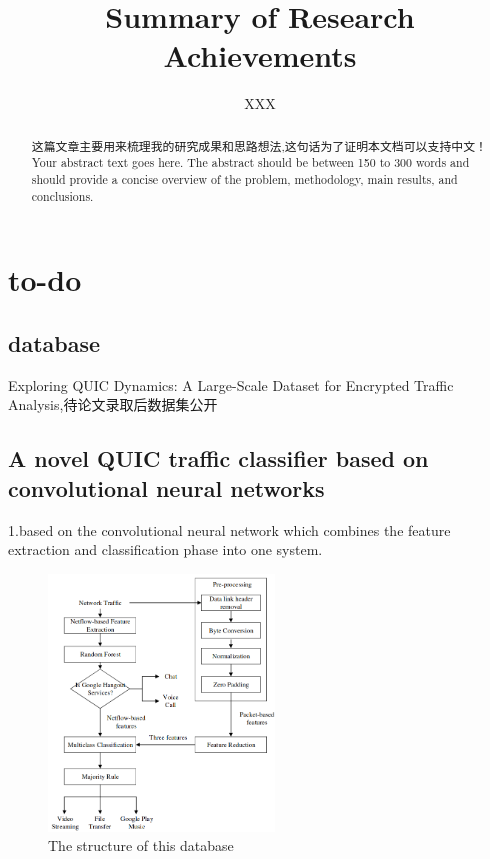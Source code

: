 \documentclass[a4paper, 10pt]{article}
\date{}
\title{
	Summary of Research Achievements %
}
\author[1,*]{XXX}
\affil[1]{Computer Science and Technology, Zhejiang University, Hangzhou, China}
\begin{document}
\maketitle %
\begin{abstract}
	这篇文章主要用来梳理我的研究成果和思路想法,这句话为了证明本文档可以支持中文！%
	Your abstract text goes here. The abstract should be between 150 to 300 words and should provide a concise overview of the problem, methodology, main results, and conclusions.
\end{abstract}


\section{to-do}


\subsection{database}
Exploring QUIC Dynamics: A Large-Scale Dataset for  Encrypted Traffic Analysis,待论文录取后数据集公开



\subsection{A novel QUIC traffic classifier based on convolutional neural networks}

1.based on the convolutional neural network which combines the feature extraction and classification phase into one system.
\begin{figure}[ht]
	\centering
	\begin{minipage}{0.5\textwidth}%
		\includegraphics[width=6cm]{1205.jpg}
		\caption{The structure of this database}
		\label{fig:cnn}
	\end{minipage}
\end{figure}
\end{document}
